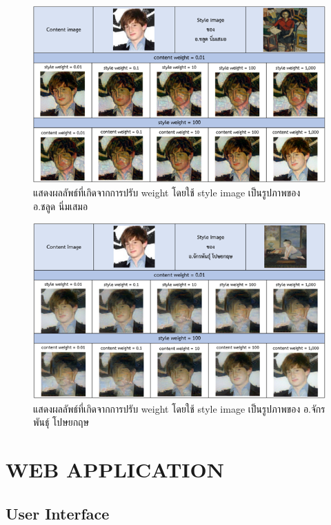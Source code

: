 \documentclass[12pt,oneside,openright,a4paper]{cpe-thai-project}
\begin{document}
\begin{figure}[!h]
  \centering
  \includegraphics[width=12cm]{./image/model5.png}
  \caption{แสดงผลลัพธ์ที่เกิดจากการปรับ weight โดยใช้ style image เป็นรูปภาพของ อ.ชลูด นิ่มเสมอ}
  \label{fig:model5}
\end{figure}

\begin{figure}[!h]
  \centering
  \includegraphics[width=12cm]{./image/model6.png}
  \caption{แสดงผลลัพธ์ที่เกิดจากการปรับ weight โดยใช้ style image เป็นรูปภาพของ อ.จักรพันธุ์ โปษยกฤษ}
  \label{fig:model6}
\end{figure}

\newpage
\section{WEB APPLICATION}
\subsection{User Interface }
\end{document}
